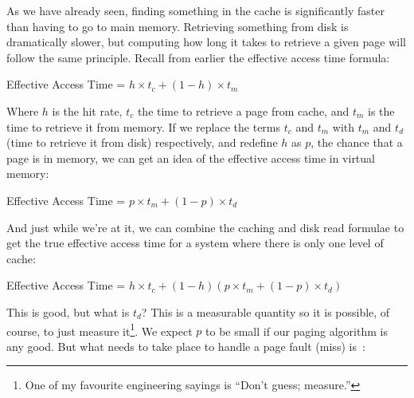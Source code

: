 As we have already seen, finding something in the cache is significantly faster than having to go to main memory. Retrieving something from disk is dramatically slower, but computing how long it takes to retrieve a given page will follow the same principle. Recall from earlier the effective access time formula:

\begin{center}
	Effective Access Time = $ h \times t_{c} + (1 - h) \times t_{m}$
\end{center}

Where $h$ is the hit rate, $t_{c}$ the time to retrieve a page from cache, and $t_{m}$ is the time to retrieve it from memory. If we replace the terms $t_{c}$ and $t_{m}$ with $t_{m}$ and $t_{d}$ (time to retrieve it from disk) respectively, and redefine $h$ as $p$, the chance that a page is in memory, we can get an idea of the effective access time in virtual memory: 

\begin{center}
	Effective Access Time = $ p \times t_{m} + (1 - p) \times t_{d}$
\end{center}

And just while we're at it, we can combine the caching and disk read formulae to get the true effective access time for a system where there is only one level of cache:

\begin{center}
	Effective Access Time = $ h \times t_{c} + (1 - h) ( p \times t_{m} + (1 - p) \times t_{d})$
\end{center}

This is good, but what is $t_{d}$? This is a measurable quantity so it is possible, of course, to just measure it\footnote{One of my favourite engineering sayings is ``Don't guess; measure.''}. We expect $p$ to be small if our paging algorithm is any good. But what needs to take place to handle a page fault (miss) is~\cite{osc}:

